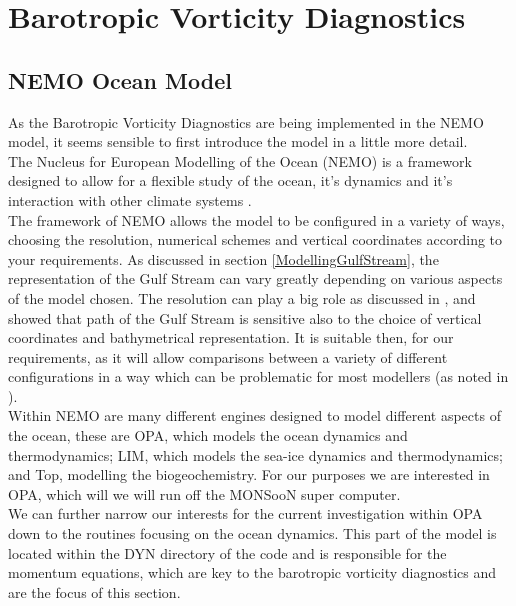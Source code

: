 \documentclass[..\EOYR.tex]{subfiles}
\begin{document}
\section{Barotropic Vorticity Diagnostics} \label{Diagnostics}

\subsection{NEMO Ocean Model}

As the Barotropic Vorticity Diagnostics are being implemented in the NEMO model, it seems sensible to first introduce the model in a little more detail. \\
The Nucleus for European Modelling of the Ocean (NEMO) is a framework designed to allow for a flexible study of the ocean, it's dynamics and it's interaction with other climate systems \citep{Madec2011}. \\

The framework of NEMO allows the model to be configured in a variety of ways, choosing the resolution, numerical schemes and vertical coordinates according to your requirements. As discussed in section \ref{ModellingGulfStream}, the representation of the Gulf Stream can vary greatly depending on various aspects of the model chosen. The resolution can play a big role as discussed in \citep{Scaife2011}, and \citep{Ezer2016b} showed that path of the Gulf Stream is sensitive also to the choice of vertical coordinates and bathymetrical representation. It is suitable then, for our requirements, as it will allow comparisons between a variety of different configurations in a way which can be problematic for most modellers (as noted in \citep{Ezer2016b}).\\

Within NEMO are many different engines designed to model different aspects of the ocean, these are OPA, which models the ocean dynamics and thermodynamics; LIM, which models the sea-ice dynamics and thermodynamics; and Top, modelling the biogeochemistry. For our purposes we are interested in OPA, which will we will run off the MONSooN super computer.\\
We can further narrow our interests for the current investigation within OPA down to the routines focusing on the ocean dynamics. This part of the model is located within the DYN directory of the code and is responsible for the momentum equations, which are key to the barotropic vorticity diagnostics and are the focus of this section. \\
\end{document}
